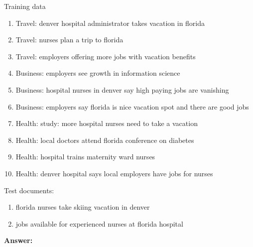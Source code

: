 \documentclass[11pt]{article}
\begin{document}
\begin{enumerate}
        Training data

        \begin{enumerate}
            \item Travel: denver hospital administrator takes vacation in florida
            \item Travel: nurses plan a trip to florida
            \item Travel: employers offering more jobs with vacation benefits
            \item Business: employers see growth in information science
            \item Business: hospital nurses in denver say high paying jobs are vanishing
            \item Business: employers say florida is nice vacation spot and there are good jobs
            \item Health: study: more hospital nurses need to take a vacation
            \item Health: local doctors attend florida conference on diabetes
            \item Health: hospital trains maternity ward nurses
            \item Health: denver hospital says local employers have jobs for nurses
        \end{enumerate}

        Test documents:
        \begin{enumerate}
            \item florida nurses take skiing vacation in denver
            \item jobs available for experienced nurses at florida hospital
        \end{enumerate}

        \textbf{Answer:}

    \end{enumerate}
\end{document}
